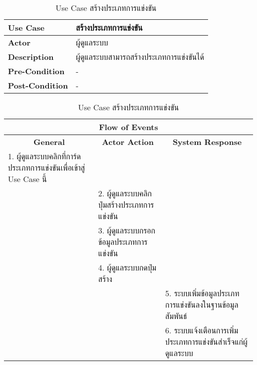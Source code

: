 \begin{table}[H]
    \caption{Use Case สร้างประเภทการแข่งขัน}
    \label{tab:usecase-create-contest}
    \begin{tabularx}{\textwidth}{ | p{3cm} | X | }
    \hline
    \textbf{Use Case} & สร้างประเภทการแข่งขัน \\
    \hline
    \textbf{Actor} & ผู้ดูแลระบบ \\
    \hline
    \textbf{Description} & ผู้ดูแลระบบสามารถสร้างประเภทการแข่งขันได้ \\
    \hline
    \textbf{Pre-Condition} & - \\
    \hline
    \textbf{Post-Condition} & - \\
    \hline
    \end{tabularx}
    \begin{tabularx}{\textwidth}{ | X | X | X | }
    \multicolumn{3}{|c|}{\textbf{Flow of Events}} \\
    \hline
    \multicolumn{1}{|c|}{\textbf{General}} & \multicolumn{1}{|c|}{\textbf{Actor Action}} & \multicolumn{1}{|c|}{\textbf{System Response}} \\
    \hline
    1. ผู้ดูแลระบบคลิกที่การ์ดประเภทการแข่งขันเพื่อเข้าสู่ Use Case นี้ &  &  \\
    \hline
    & 2. ผู้ดูแลระบบคลิกปุ่มสร้างประเภทการแข่งขัน  &  \\
    \hline
    & 3. ผู้ดูแลระบบกรอกข้อมูลประเภทการแข่งขัน  &  \\
    \hline
    & 4. ผู้ดูแลระบบกดปุ่มสร้าง &  \\
    \hline
    & & 5. ระบบเพิ่มข้อมูลประเภทการแข่งขันลงในฐานข้อมูลสัมพันธ์ \\
    \hline
    & & 6. ระบบแจ้งเตือนการเพิ่มประเภทการแข่งขันสำเร็จแก่ผู้ดูแลระบบ \\
    \hline
    \end{tabularx}
\end{table}
